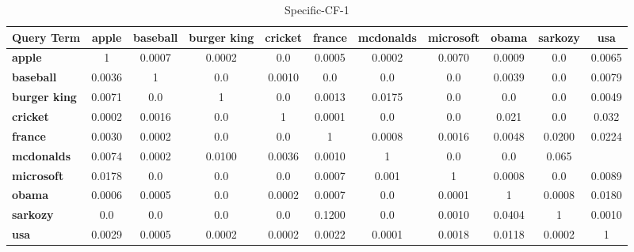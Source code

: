 \documentclass{sig-alternate}
\begin{document}
\begin{table}[!ht]
\centering
\resizebox{14cm}{!} 
{
	\begin{tabular}{|l|c|c|c|c|c|c|c|c|c|c|}
	\hline
	\textbf{Query Term}  & \textbf{apple} & \textbf{baseball} & \textbf{burger king} & \textbf{cricket} & \textbf{france} & \textbf{mcdonalds} & \textbf{microsoft} & \textbf{obama} & \textbf{sarkozy} & \textbf{usa}\\
	\hline
\textbf{	apple} & 1 & 0.0007 & 0.0002 &  0.0 & 0.0005 & 0.0002 & 0.0070 & 0.0009 & 0.0 & 0.0065\\
	\hline
\textbf{	baseball} & 0.0036 & 1 & 0.0 & 0.0010 & 0.0 & 0.0  & 0.0 & 0.0039 & 0.0 & 0.0079\\
	\hline
\textbf{	burger king }& 0.0071 & 0.0 & 1 & 0.0 & 0.0013 & 0.0175 & 0.0 & 0.0 & 0.0 & 0.0049\\
	\hline
\textbf{	cricket }& 0.0002 & 0.0016 & 0.0 & 1 & 0.0001 & 0.0 & 0.0 & 0.021 & 0.0 & 0.032\\
	\hline
\textbf{	france }& 0.0030 & 0.0002 & 0.0 & 0.0 & 1 & 0.0008 & 0.0016 & 0.0048 & 0.0200 & 0.0224\\
	\hline
\textbf{	mcdonalds} & 0.0074 & 0.0002 & 0.0100 & 0.0036 & 0.0010 & 1 & 0.0 & 0.0 & 0.065\\
	\hline
\textbf{	microsoft} & 0.0178 & 0.0 & 0.0 & 0.0 & 0.0007 & 0.001 & 1 & 0.0008 & 0.0 & 0.0089
	\\
	\hline
\textbf{	obama} & 0.0006 & 0.0005 & 0.0 & 0.0002 & 0.0007 & 0.0 & 0.0001 & 1 & 0.0008 & 0.0180
	\\
	\hline
\textbf{	sarkozy} & 0.0 & 0.0 & 0.0 & 0.0 & 0.1200 & 0.0 & 0.0010 & 0.0404 & 1 & 0.0010
	\\
	\hline
\textbf{	usa} & 0.0029 & 0.0005 & 0.0002 & 0.0002 & 0.0022 & 0.0001 & 0.0018 & 0.0118 & 0.0002 & 1\\
	\hline
	\end{tabular}
}
\caption{Specific-CF-1}\label{cf4}
\end{table}
\end{document}
